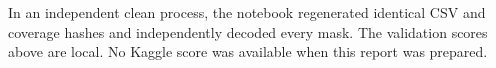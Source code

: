 In an independent clean process, the notebook regenerated identical CSV and coverage hashes and independently decoded every mask. The validation scores above are local. No Kaggle score was available when this report was prepared.